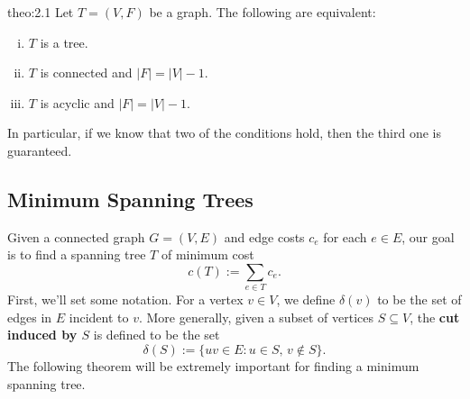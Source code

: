 \begin{theo}{theo:2.1}
    Let $T = (V, F)$ be a graph. The following are equivalent:
    \begin{enumerate}[(i)]
        \item $T$ is a tree. 
        \item $T$ is connected and $|F| = |V| - 1$. 
        \item $T$ is acyclic and $|F| = |V| - 1$. 
    \end{enumerate}
\end{theo}\vspace{-0.25cm}

In particular, if we know that two of the conditions hold, then the 
third one is guaranteed.

\subsection{Minimum Spanning Trees}\label{subsec:2.2}
Given a connected graph $G = (V, E)$ and edge costs $c_e$ for each 
$e \in E$, our goal is to find a spanning tree $T$ of minimum cost 
\[ c(T) := \sum_{e \in T} c_e. \] 
First, we'll set some notation. For a vertex $v \in V$, we define 
$\delta(v)$ to be the set of edges in $E$ incident to $v$. More generally, 
given a subset of vertices $S \subseteq V$, the {\bf cut induced by $S$} is 
defined to be the set 
\[ \delta(S) := \{uv \in E : u \in S,\, v \notin S\}. \] 
The following theorem will be extremely important for finding a minimum 
spanning tree. 


